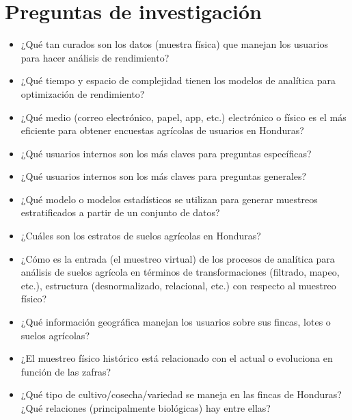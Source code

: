 \documentclass{report}
\begin{document}
\section{Preguntas de investigación}

\begin{itemize}
    \item ¿Qué tan curados son los datos (muestra física) que manejan los usuarios para hacer análisis de rendimiento?
    
    \item ¿Qué tiempo y espacio de complejidad tienen los modelos de analítica para optimización de rendimiento?
    
    \item ¿Qué medio (correo electrónico, papel, app, etc.) electrónico o físico es el más eficiente para obtener encuestas agrícolas de usuarios en Honduras?
    
    \item ¿Qué usuarios internos son los más claves para preguntas específicas?
    
    \item ¿Qué usuarios internos son los más claves para preguntas generales?
    
    \item ¿Qué modelo o modelos estadísticos se utilizan para generar muestreos estratificados a partir de un conjunto de datos?
    
    \item ¿Cuáles son los estratos de suelos agrícolas en Honduras?
    
    \item ¿Cómo es la entrada (el muestreo virtual) de los procesos de analítica para análisis de suelos agrícola en términos de transformaciones (filtrado, mapeo, etc.), estructura (desnormalizado, relacional, etc.) con respecto al muestreo físico?
    
    \item ¿Qué información geográfica manejan los usuarios sobre sus fincas, lotes o suelos agrícolas?
    
    \item ¿El muestreo físico histórico está relacionado con el actual o evoluciona en función de las zafras?
    
    \item ¿Qué tipo de cultivo/cosecha/variedad se maneja en las fincas de Honduras? ¿Qué relaciones (principalmente biológicas) hay entre ellas?
\end{itemize}
\end{document}
